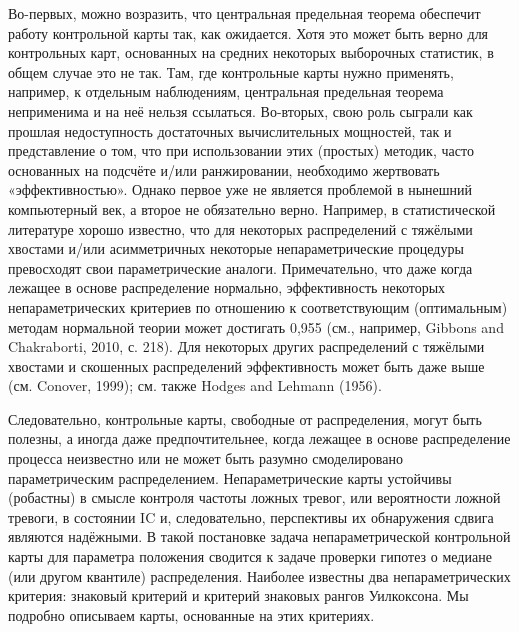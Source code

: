 Во-первых, можно возразить, что центральная предельная теорема обеспечит работу контрольной карты так, как ожидается. Хотя это может быть верно для контрольных карт, основанных на средних некоторых выборочных статистик, в общем случае это не так. Там, где контрольные карты нужно применять, например, к отдельным наблюдениям, центральная предельная теорема неприменима и на неё нельзя ссылаться. Во-вторых, свою роль сыграли как прошлая недоступность достаточных вычислительных мощностей, так и представление о том, что при использовании этих (простых) методик, часто основанных на подсчёте и/или ранжировании, необходимо жертвовать «эффективностью». Однако первое уже не является проблемой в нынешний компьютерный век, а второе не обязательно верно. Например, в статистической литературе хорошо известно, что для некоторых распределений с тяжёлыми хвостами и/или асимметричных некоторые непараметрические процедуры превосходят свои параметрические аналоги. Примечательно, что даже когда лежащее в основе распределение нормально, эффективность некоторых непараметрических критериев по отношению к соответствующим (оптимальным) методам нормальной теории может достигать 0,955 (см., например, Gibbons and Chakraborti, 2010, с. 218). Для некоторых других распределений с тяжёлыми хвостами и скошенных распределений эффективность может быть даже выше (см. Conover, 1999); см. также Hodges and Lehmann (1956).

Следовательно, контрольные карты, свободные от распределения, могут быть полезны, а иногда даже предпочтительнее, когда лежащее в основе распределение процесса неизвестно или не может быть разумно смоделировано параметрическим распределением. Непараметрические карты устойчивы (робастны) в смысле контроля частоты ложных тревог, или вероятности ложной тревоги, в состоянии IC и, следовательно, перспективы их обнаружения сдвига являются надёжными. В такой постановке задача непараметрической контрольной карты для параметра положения сводится к задаче проверки гипотез о медиане (или другом квантиле) распределения. Наиболее известны два непараметрических критерия: знаковый критерий и критерий знаковых рангов Уилкоксона. Мы подробно описываем карты, основанные на этих критериях.

